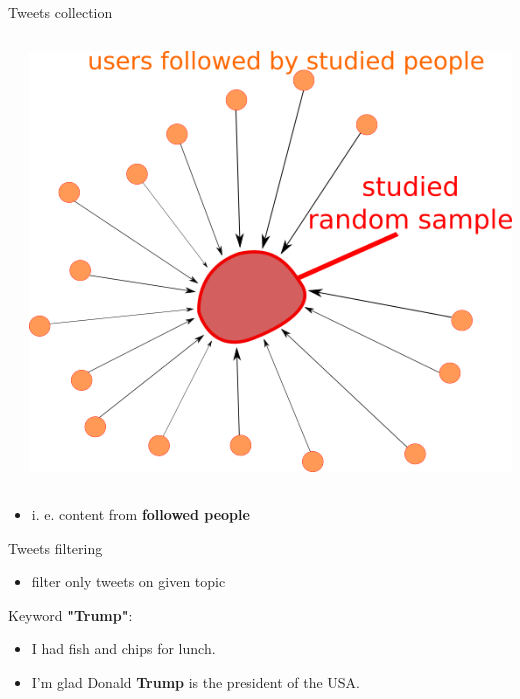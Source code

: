 \documentclass{beamer}
\newcommand{\cmark}{\ding{51}} %
\newcommand{\xmark}{\ding{55}} %
\begin{document}
\begin{frame}[fragile]
\begin{columns}[T]
\begin{column}{.33\textwidth}
\begin{block}{Tweets collection}
\begin{columns}
\begin{itemize}
    	\end{itemize}
    	\center
    	\includegraphics[scale=0.65]{./Pics/followers.png}
    \end{columns}
    \vspace{0.8cm}
    \begin{itemize}
        \item i. e. content from \textbf{followed people}
    \end{itemize}
\end{block}
\begin{block}{Tweets filtering}
\begin{itemize}
    \item filter only tweets on given topic
\end{itemize}
\vspace{0.3cm}
Keyword \textbf{"Trump"}:
\vspace{0.7cm}
\begin{itemize}\centering
    \item[\textcolor{black}{\xmark}] I had fish and chips for lunch.
    \item[\textcolor{black}{\cmark}] I'm glad Donald \textbf{Trump} is the president of the USA.
\end{itemize}
\end{block}

\end{column}
\end{columns}
\end{frame}
\end{document}
